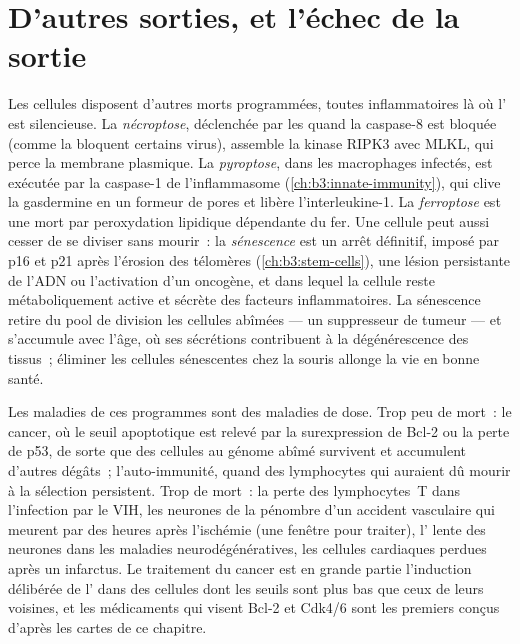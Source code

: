 \section{D'autres sorties, et l'échec de la sortie}

\begin{definition}\label{def:b3:cell-cycle-apoptosis:other}
Les cellules disposent d'autres morts programmées, toutes
inflammatoires là où l' est silencieuse. La
\emph{nécroptose}, déclenchée par les  quand la
caspase-8 est bloquée (comme la bloquent certains virus), assemble la
kinase RIPK3 avec MLKL, qui perce la membrane plasmique. La
\emph{pyroptose}, dans les macrophages infectés, est exécutée par la
caspase-1 de l'inflammasome (\cref{ch:b3:innate-immunity}), qui clive
la gasdermine en un formeur de pores et libère l'interleukine-1. La
\emph{ferroptose} est une mort par peroxydation lipidique dépendante du
fer. Une cellule peut aussi cesser de se diviser sans mourir~: la
\emph{sénescence} est un arrêt définitif, imposé par p16 et p21 après
l'érosion des télomères (\cref{ch:b3:stem-cells}), une lésion
persistante de l'ADN ou l'activation d'un oncogène, et dans lequel la
cellule reste métaboliquement active et sécrète des facteurs
inflammatoires. La sénescence retire du pool de division les cellules
abîmées --- un suppresseur de tumeur --- et s'accumule avec l'âge, où
ses sécrétions contribuent à la dégénérescence des tissus~; éliminer
les cellules sénescentes chez la souris allonge la vie en bonne santé.
\end{definition}

\begin{remark}\label{rem:b3:cell-cycle-apoptosis:disease}
Les maladies de ces programmes sont des maladies de dose. Trop peu de
mort~: le cancer, où le seuil apoptotique est relevé par la
surexpression de Bcl-2 ou la perte de p53, de sorte que des cellules au
génome abîmé survivent et accumulent d'autres dégâts~; l'auto-immunité,
quand des lymphocytes qui auraient dû mourir à la sélection persistent.
Trop de mort~: la perte des lymphocytes~T dans l'infection par le VIH,
les neurones de la pénombre d'un accident vasculaire qui meurent par
 des heures après l'ischémie (une fenêtre pour traiter),
l' lente des neurones dans les maladies neurodégénératives, les
cellules cardiaques perdues après un infarctus. Le traitement du cancer
est en grande partie l'induction délibérée de l' dans des
cellules dont les seuils sont plus bas que ceux de leurs voisines, et
les médicaments qui visent Bcl-2 et Cdk4/6 sont les premiers conçus
d'après les cartes de ce chapitre.
\end{remark}

